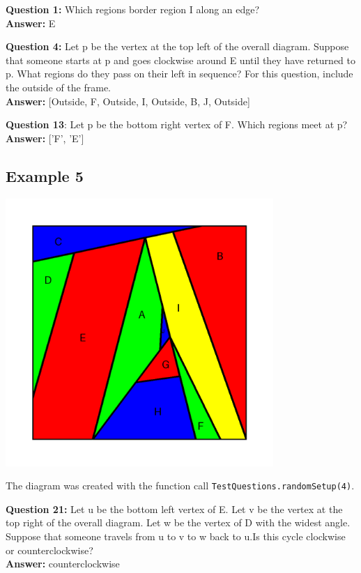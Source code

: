 \documentclass{article}    %
\begin{document}
{\bf Question  1:} Which regions border region I along an edge? \\
{\bf Answer:}  {E}

{\bf Question  4:} Let p be the vertex at the top left of the overall diagram. Suppose that someone starts at p and goes clockwise around E until they have returned to p. What regions do they pass on their left in sequence? For this question, include the outside of the frame. \\
{\bf Answer:}  [Outside, F, Outside, I, Outside, B, J, Outside]

{\bf Question  13}: Let p be the bottom right vertex of F. Which regions meet at p? \\
{\bf Answer:} ['F', 'E']


\pagebreak

\subsection{Example 5}
\begin{center}
\includegraphics[height=4in]{Maps/RandomSetup4.png}
\end{center}

{\small  The diagram was created with the function 
call {\tt TestQuestions.randomSetup(4)}.}

{\bf Question  21:} Let u be the bottom left vertex of E. Let v be the vertex at the top right of the overall diagram. Let w be the vertex of D with the widest angle. Suppose that someone travels from u to v to w back to u.Is this cycle clockwise or counterclockwise? \\
{\bf Answer:}  counterclockwise
\end{document}
